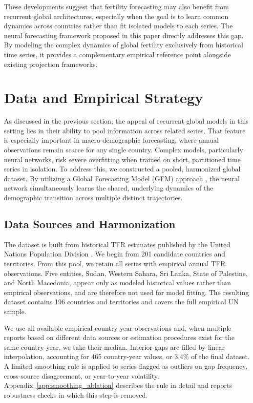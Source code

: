 \documentclass[12pt]{article}
\begin{document}
These developments suggest that fertility forecasting may also benefit from recurrent global architectures, especially when the goal is to learn common dynamics across countries rather than fit isolated models to each series. The neural forecasting framework proposed in this paper directly addresses this gap. By modeling the complex dynamics of global fertility exclusively from historical time series, it provides a complementary empirical reference point alongside existing projection frameworks.

\section{Data and Empirical Strategy}

As discussed in the previous section, the appeal of recurrent global models in this setting lies in their ability to pool information across related series. That feature is especially important in macro-demographic forecasting, where annual observations remain scarce for any single country. Complex models, particularly neural networks, risk severe overfitting when trained on short, partitioned time series in isolation. To address this, we constructed a pooled, harmonized global dataset. By utilizing a Global Forecasting Model (GFM) approach \citep{januschowski2020criteria, montero2021principles}, the neural network simultaneously learns the shared, underlying dynamics of the demographic transition across multiple distinct trajectories.

\subsection{Data Sources and Harmonization}

The dataset is built from historical TFR estimates published by the United Nations Population Division \citep{un2024wpp}. We begin from 201 candidate countries and territories. From this pool, we retain all series with empirical annual TFR observations. Five entities, Sudan, Western Sahara, Sri Lanka, State of Palestine, and North Macedonia, appear only as modeled historical values rather than empirical observations, and are therefore not used for model fitting. The resulting dataset contains 196 countries and territories and covers the full empirical UN sample.

We use all available empirical country-year observations and, when multiple reports based on different data sources or estimation procedures exist for the same country-year, we take their median. Interior gaps are filled by linear interpolation, accounting for 465 country-year values, or 3.4\% of the final dataset. A limited smoothing rule is applied to series flagged as outliers on gap frequency, cross-source disagreement, or year-to-year volatility. Appendix~\ref{app:smoothing_ablation} describes the rule in detail and reports robustness checks in which this step is removed.
\end{document}
